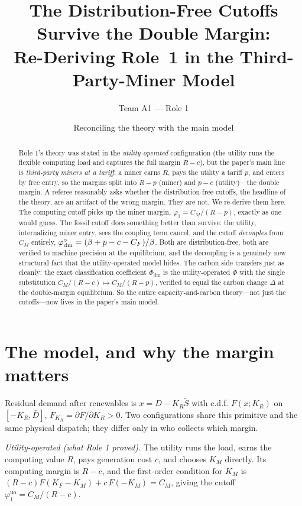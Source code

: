 \documentclass[11pt,reqno]{amsart}
\theoremstyle{plain}\newtheorem{theorem}{Theorem}\newtheorem{proposition}[theorem]{Proposition}
\theoremstyle{remark}\newtheorem{remark}[theorem]{Remark}\newtheorem{observation}[theorem]{Observation}
\newcommand{\KR}{K_R}\newcommand{\KF}{K_F}\newcommand{\KM}{K_M}
\newcommand{\CM}{C_M}\newcommand{\CF}{C_F}\newcommand{\CR}{C_R}
\newcommand{\phio}{\varphi^{\circ}}\newcommand{\FKR}{F_{\KR}}\newcommand{\Dbar}{\bar D}
\begin{document}
\title[The cutoffs in the paper's main model]{The Distribution-Free Cutoffs Survive the Double
Margin:\\ Re-Deriving Role~1 in the Third-Party-Miner Model}
\author{Team A1 --- Role 1}
\date{Reconciling the theory with the main model}
\begin{abstract}
Role 1's theory was stated in the \emph{utility-operated} configuration (the utility runs the
flexible computing load and captures the full margin $R-c$), but the paper's main line is
\emph{third-party miners at a tariff}: a miner earns $R$, pays the utility a tariff $p$, and
enters by free entry, so the margins split into $R-p$ (miner) and $p-c$ (utility)---the double
margin. A referee reasonably asks whether the distribution-free cutoffs, the headline of the
theory, are an artifact of the wrong margin. They are not. We re-derive them here. The
computing cutoff picks up the miner margin, $\varphi_1=\CM/(R-p)$, exactly as one would guess.
The fossil cutoff does something better than survive: the utility, internalizing miner entry,
sees the coupling term cancel, and the cutoff \emph{decouples} from $\CM$ entirely,
$\phio_{\mathrm{dm}}=(\bp-c-\CF)/\beta$. Both are distribution-free, both are verified to
machine precision at the equilibrium, and the decoupling is a genuinely new structural fact
that the utility-operated model hides. The carbon side transfers just as cleanly: the exact
classification coefficient $\Phi_{\mathrm{dm}}$ is the utility-operated $\Phi$ with the single
substitution $\CM/(R-c)\mapsto\CM/(R-p)$, verified to equal the carbon change $\Delta$ at the
double-margin equilibrium. So the entire capacity-and-carbon theory---not just the cutoffs---now
lives in the paper's main model.
\end{abstract}
\maketitle

\section{The model, and why the margin matters}
Residual demand after renewables is $x=D-\KR\tilde S$ with c.d.f. $F(x;\KR)$ on
$[-\KR,\Dbar]$, $\FKR=\partial F/\partial\KR>0$. Two configurations share this primitive and
the same physical dispatch; they differ only in who collects which margin.

\emph{Utility-operated (what Role 1 proved).} The utility runs the load, earns the computing
value $R$, pays generation cost $c$, and chooses $\KM$ directly. Its computing margin is
$R-c$, and the first-order condition for $\KM$ is
$(R-c)F(\KF-\KM)+c\,F(-\KM)=\CM$, giving the cutoff $\varphi_1^{\mathrm{uo}}=\CM/(R-c)$.
\end{document}

